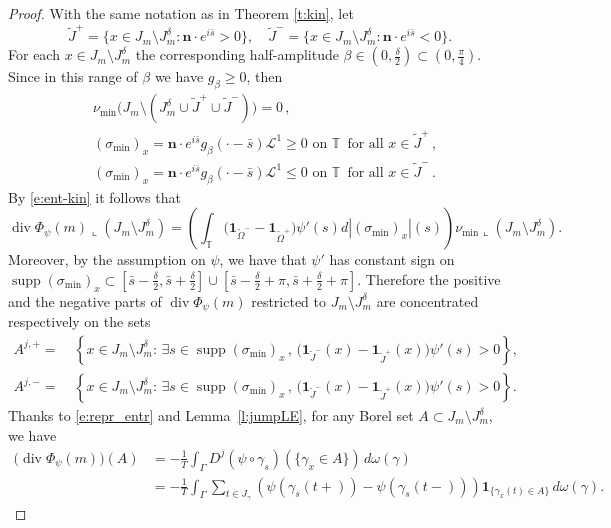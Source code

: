 \documentclass[fleqn
]{article}
\numberwithin{equation}{section}
\newcommand{\T}{{\mathbb T}}
\DeclareMathOperator{\dv}{div}
\DeclareMathOperator{\supp}{supp}
\theoremstyle{definition}
\begin{document}
\begin{proof}
With the same notation as in Theorem \ref{t:kin}, let
\[
\tilde J^+ = \{x \in J_m \setminus J_m^\delta : \mathbf n \cdot e^{i\bar s}>0\}, \quad \tilde J^- = \{x \in J_m \setminus J_m^\delta : \mathbf n \cdot e^{i\bar s}<0\}.
\]
For each $x \in J_m\setminus J_m^\delta$ the corresponding half-amplitude $\beta \in (0, \frac\delta2) \subset (0,\frac\pi4)$. Since in this range of $\beta$ we have $g_\beta\ge 0$, then 
\begin{align*}
&\nu_{\min}\big(J_m \setminus (J_m^\delta\cup\tilde J^+\cup\tilde J^-)\big)=0\,,\\
&
(\sigma_{\min})_x  
= \mathbf{n} \cdot e^{i\bar s} g_\beta (\cdot -\bar s) \mathcal L^1
\geq 0 \text{ on }\T\, \text{ for all }x\in\tilde J^+\,,\\
&
(\sigma_{\min})_x 
=
\mathbf{n} \cdot e^{i\bar s} g_\beta (\cdot -\bar s) \mathcal L^1\leq 0 \text{ on }\T\, \text{ for all }x\in\tilde J^-\,.
\end{align*}
%
By \eqref{e:ent-kin} it follows that 
\[
\dv \Phi_\psi (m) \llcorner (J_m\setminus J_m^\delta) = \left( \int_\T \big(\mathbf 1_{\tilde\Omega^-}-\mathbf 1_{\tilde\Omega^+}\big) \psi'(s) d |(\sigma_{\min})_x| (s)\right) \nu_{\min}\llcorner (J_m\setminus J_m^\delta).
\]
Moreover, by the assumption on $\psi$, we have that $\psi'$ has constant sign on 
$\supp (\sigma_{\min})_x \subset [\bar s -\frac\delta 2, \bar s + \frac \delta 2] \cup [\bar s -\frac\delta 2 + \pi, \bar s + \frac \delta 2 + \pi]$. Therefore the positive and the negative parts of $\dv \Phi_\psi(m)$ restricted to $J_m\setminus J_m^\delta$ are concentrated respectively on the sets
\[
\begin{split}
 A^{j,+} =  &~ \left\{x \in J_m \setminus J_m^\delta: \, \exists s \in \supp  (\sigma_{\min})_x \, ,\,  \big(\mathbf 1_{\tilde J^-}(x)-\mathbf 1_{\tilde J^+}(x)\big) \psi'(s)>0 \right\}, 
\\
 A^{j,-} = &~ \left\{x \in J_m \setminus J_m^\delta: \, \exists s \in \supp  (\sigma_{\min})_x \, ,\,  \big(\mathbf 1_{\tilde J^-}(x)-\mathbf 1_{\tilde J^+}(x)\big)\psi'(s)>0 \right\}.
\end{split}
\]
Thanks to \eqref{e:repr_entr} and Lemma~\ref{l:jumpLE}, for any Borel set $A\subset J_m\setminus J_m^\delta$, we have
\begin{align}\label{e:jump-part}
\big(\dv\Phi_\psi(m)\big) (A)
&=-\frac 1T \int_\Gamma  D^j(\psi\circ \gamma_s)(\lbrace \gamma_x\in A\rbrace)\, d\omega(\gamma)\, \\
&=-\frac 1T \int_\Gamma \sum_{t \in J_\gamma}\left( \psi(\gamma_s(t+))-\psi(\gamma_s(t-)) \right) \mathbf 1_{\{\gamma_x(t)\in A\}} \, d\omega(\gamma).

\end{align}
\end{proof}
\end{document}
